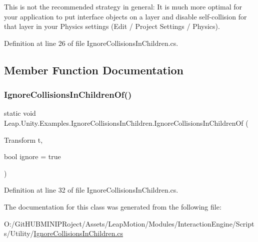 This is not the recommended strategy in general\+: It is much more optimal for your application to put interface objects on a layer and disable self-\/collision for that layer in your Physics settings (Edit / Project Settings / Physics). 

Definition at line 26 of file Ignore\+Collisions\+In\+Children.\+cs.



\subsection{Member Function Documentation}
\mbox{\label{class_leap_1_1_unity_1_1_examples_1_1_ignore_collisions_in_children_a0b10c65bc5ec6cc178f4b0d914f8e4b5}} 
\subsubsection{\texorpdfstring{IgnoreCollisionsInChildrenOf()}{IgnoreCollisionsInChildrenOf()}}
{\footnotesize\ttfamily static void Leap.\+Unity.\+Examples.\+Ignore\+Collisions\+In\+Children.\+Ignore\+Collisions\+In\+Children\+Of (\begin{DoxyParamCaption}\item[{Transform}]{t,  }\item[{bool}]{ignore = {\ttfamily true} }\end{DoxyParamCaption})\hspace{0.3cm}{\ttfamily [static]}}



Definition at line 32 of file Ignore\+Collisions\+In\+Children.\+cs.



The documentation for this class was generated from the following file\+:\begin{DoxyCompactItemize}
\item 
O\+:/\+Git\+H\+U\+B\+M\+I\+N\+I\+P\+Roject/\+Assets/\+Leap\+Motion/\+Modules/\+Interaction\+Engine/\+Scripts/\+Utility/\mbox{\hyperlink{_ignore_collisions_in_children_8cs}{Ignore\+Collisions\+In\+Children.\+cs}}\end{DoxyCompactItemize}
